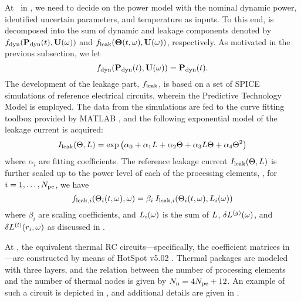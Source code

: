 At \ in , we need to decide on the power model with the nominal dynamic power, identified uncertain parameters, and temperature as inputs. To this end,  is decomposed into the sum of dynamic and leakage components denoted by $f_{\text{dyn}}(\mathbf{P}_{\text{dyn}}(t), \mathbf{U}(\omega))$ and $f_{\text{leak}}({\boldsymbol\Theta}(t, \omega), \mathbf{U}(\omega))$, respectively. As motivated in the previous subsection, we let
\[
  f_{\text{dyn}}(\mathbf{P}_{\text{dyn}}(t), \mathbf{U}(\omega)) = \mathbf{P}_{\text{dyn}}(t).
\]
The development of the leakage part, $f_{\text{leak}}$, is based on a set of SPICE simulations of reference electrical circuits, wherein the Predictive Technology Model \cite{ptm} is employed. The data from the simulations are fed to the curve fitting toolbox provided by MATLAB \cite{matlab}, and the following exponential model of the leakage current is acquired:
\begin{equation} \elabel{leakage-current}
  I_\leak(\T, \Leff) = \exp \left( \alpha_0 + \alpha_1 \Leff + \alpha_2 \T + \alpha_3 \Leff \T + \alpha_4 \T^2 \right)
\end{equation}
where $\alpha_i$ are fitting coefficients. The reference leakage current $I_{\text{leak}}(\Theta, L)$ is further scaled up to the power level of each of the processing elements, \ie, for $i = 1, \dotsc, {N_\text{pe}}$, we have
\[
  f_{\text{leak}, i}(\Theta_i(t, \omega), \omega) = \beta_i \: I_{\text{leak}, i}(\Theta_i(t, \omega), L_i(\omega))
\]
where $\beta_i$ are scaling coefficients, and $L_i(\omega)$ is the sum of $L$, ${\delta L^{(g)}}(\omega)$, and $\delta L^{(l)}(r_i, \omega)$ as discussed in .

At , the equivalent thermal RC circuits---specifically, the coefficient matrices in ---are constructed by means of HotSpot v5.02 \cite{hotspot}. Thermal packages are modeled with three layers, and the relation between the number of processing elements and the number of thermal nodes is given by $N_\text{n} = 4 {N_\text{pe}} + 12$. An example of such a circuit is depicted in , and additional details are given in .
